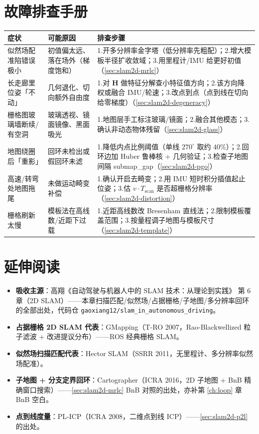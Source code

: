 \section*{故障排查手册}
\begin{table}[H]\centering\small
\begin{tabular}{p{} p{} p{}}
\toprule
症状 & 可能原因 & 排查步骤 \\
\midrule
似然场配准陷错误极小 & 初值偏太远、落在场外（梯度饱和） & 1.开多分辨率金字塔（低分辨率先粗配）；2.增大模板半径扩收敛域；3.用里程计/IMU 给更好初值（\cref{sec:slam2d-mrlc}）\\
长走廊里位姿「不动」 & 几何退化、切向额外自由度 & 1.对 $\mathbf{H}$ 做特征分解查小特征值方向；2.该方向降权或融合 IMU/轮速；3.改点到点（点到线在切向给零梯度）（\cref{sec:slam2d-degeneracy}）\\
栅格图玻璃墙断续/有空洞 & 玻璃透视、镜面镜像、黑面吸光 & 1.地图层手工标注玻璃/镜面；2.融合其他模态；3.确认非动态物体残留（\cref{sec:slam2d-glass}）\\
地图绕圈后「重影」 & 回环未检出或假回环未滤 & 1.降低内点比例阈值（单线 $270^\circ$ 取约 $40\%$）；2.回环边加 Huber 鲁棒核 + 几何验证；3.检查子地图间隔 submap\_gap（\cref{sec:slam2d-pgo}）\\
高速/转弯处地图拖尾 & 未做运动畸变补偿 & 1.确认开启去畸变；2.用 IMU 短时积分插值起止位姿；3.估 $v\cdot T_{\text{scan}}$ 是否超栅格分辨率（\cref{sec:slam2d-distortion}）\\
栅格刷新太慢 & 模板法在高线数/近距下过载 & 1.近距高线数改 Bresenham 直线法；2.限制模板覆盖范围；3.按量程调子地图与模板尺寸（\cref{sec:slam2d-template}）\\
\bottomrule
\end{tabular}
\end{table}

\section*{延伸阅读}
\begin{itemize}
  \item \textbf{吸收主源}：高翔《自动驾驶与机器人中的 SLAM 技术：从理论到实践》\cite{gao2023slamad} 第 6 章（2D SLAM）——本章扫描匹配/似然场/占据栅格/子地图/多分辨率回环的全部出处，代码仓 \texttt{gaoxiang12/\allowbreak slam\_in\_autonomous\_driving}。
  \item \textbf{占据栅格 2D SLAM 代表}：GMapping\cite{grisetti2007gmapping}（T-RO 2007，Rao-Blackwellized 粒子滤波 + 改进提议分布）——ROS 经典栅格 SLAM。
  \item \textbf{似然场扫描匹配代表}：Hector SLAM\cite{kohlbrecher2011hector}（SSRR 2011，无里程计、多分辨率似然场配准）。
  \item \textbf{子地图 + 分支定界回环}：Cartographer\cite{hess2016cartographer}（ICRA 2016，2D 子地图 + BnB 精确窗口搜索）——\cref{sec:slam2d-mrlc} BnB 对照的出处，亦补第 \cref{ch:loop} 章 BnB 空白。
  \item \textbf{点到线度量}：PL-ICP\cite{censi2008plicp}（ICRA 2008，二维点到线 ICP）——\cref{sec:slam2d-p2l} 的出处。
\end{itemize}

